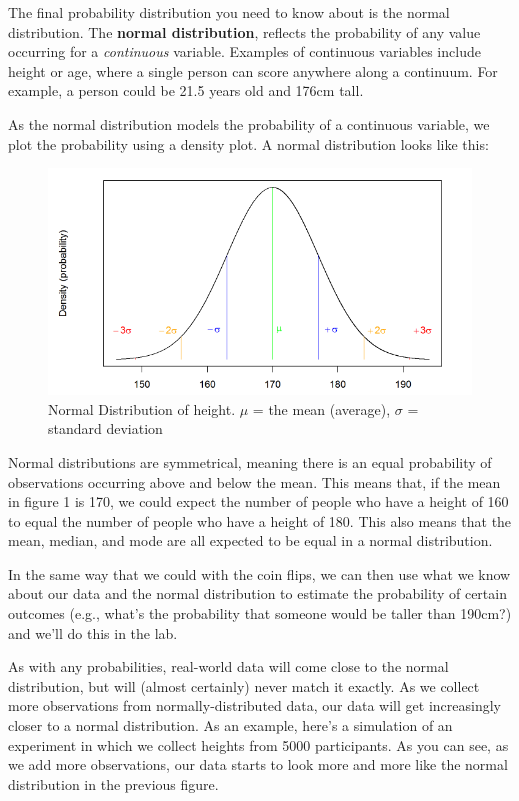 \documentclass[
  oneside]{book}
\begin{document}
The final probability distribution you need to know about is the normal distribution. The \textbf{normal distribution}, reflects the probability of any value occurring for a \emph{continuous} variable. Examples of continuous variables include height or age, where a single person can score anywhere along a continuum. For example, a person could be 21.5 years old and 176cm tall.

As the normal distribution models the probability of a continuous variable, we plot the probability using a density plot. A normal distribution looks like this:

\begin{figure}

{\centering \includegraphics[width=1\linewidth,height=1\textheight]{./images/norm_dist_height} 

}

\caption{Normal Distribution of height. $\mu$ = the mean (average), $\sigma$ = standard deviation}\label{fig:unnamed-chunk-4}
\end{figure}

Normal distributions are symmetrical, meaning there is an equal probability of observations occurring above and below the mean. This means that, if the mean in figure 1 is 170, we could expect the number of people who have a height of 160 to equal the number of people who have a height of 180. This also means that the mean, median, and mode are all expected to be equal in a normal distribution.

In the same way that we could with the coin flips, we can then use what we know about our data and the normal distribution to estimate the probability of certain outcomes (e.g., what's the probability that someone would be taller than 190cm?) and we'll do this in the lab.

As with any probabilities, real-world data will come close to the normal distribution, but will (almost certainly) never match it exactly. As we collect more observations from normally-distributed data, our data will get increasingly closer to a normal distribution. As an example, here's a simulation of an experiment in which we collect heights from 5000 participants. As you can see, as we add more observations, our data starts to look more and more like the normal distribution in the previous figure.
\end{document}
